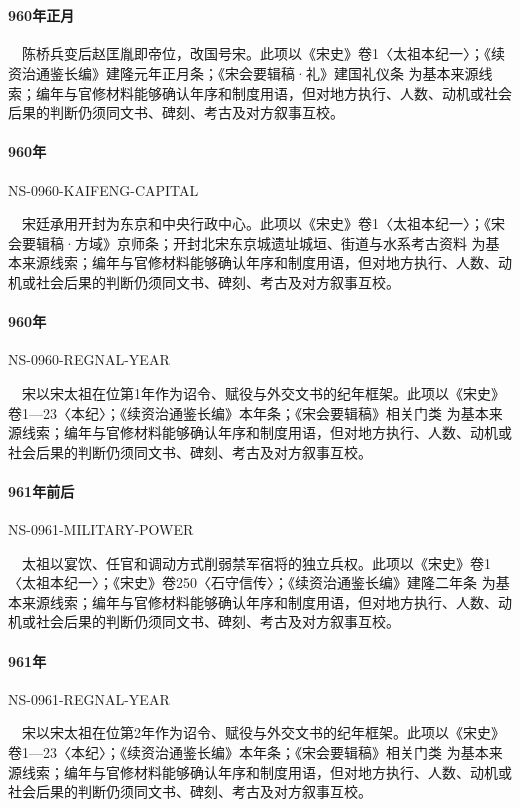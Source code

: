 \section{}

\providecommand{\eventanchor}[2]{\hypertarget{evt:#1}{#2}}

\paragraph{960年正月}　陈桥兵变后赵匡胤即帝位，改国号宋。此项以《宋史》卷1〈太祖本纪一〉；《续资治通鉴长编》建隆元年正月条；《宋会要辑稿·礼》建国礼仪条 为基本来源线索；编年与官修材料能够确认年序和制度用语，但对地方执行、人数、动机或社会后果的判断仍须同文书、碑刻、考古及对方叙事互校。

\paragraph{960年}\eventanchor{NS-0960-KAIFENG-CAPITAL}{NS-0960-KAIFENG-CAPITAL}　宋廷承用开封为东京和中央行政中心。此项以《宋史》卷1〈太祖本纪一〉；《宋会要辑稿·方域》京师条；开封北宋东京城遗址城垣、街道与水系考古资料 为基本来源线索；编年与官修材料能够确认年序和制度用语，但对地方执行、人数、动机或社会后果的判断仍须同文书、碑刻、考古及对方叙事互校。

\paragraph{960年}\eventanchor{NS-0960-REGNAL-YEAR}{NS-0960-REGNAL-YEAR}　宋以宋太祖在位第1年作为诏令、赋役与外交文书的纪年框架。此项以《宋史》卷1—23〈本纪〉；《续资治通鉴长编》本年条；《宋会要辑稿》相关门类 为基本来源线索；编年与官修材料能够确认年序和制度用语，但对地方执行、人数、动机或社会后果的判断仍须同文书、碑刻、考古及对方叙事互校。

\paragraph{961年前后}\eventanchor{NS-0961-MILITARY-POWER}{NS-0961-MILITARY-POWER}　太祖以宴饮、任官和调动方式削弱禁军宿将的独立兵权。此项以《宋史》卷1〈太祖本纪一〉；《宋史》卷250〈石守信传〉；《续资治通鉴长编》建隆二年条 为基本来源线索；编年与官修材料能够确认年序和制度用语，但对地方执行、人数、动机或社会后果的判断仍须同文书、碑刻、考古及对方叙事互校。

\paragraph{961年}\eventanchor{NS-0961-REGNAL-YEAR}{NS-0961-REGNAL-YEAR}　宋以宋太祖在位第2年作为诏令、赋役与外交文书的纪年框架。此项以《宋史》卷1—23〈本纪〉；《续资治通鉴长编》本年条；《宋会要辑稿》相关门类 为基本来源线索；编年与官修材料能够确认年序和制度用语，但对地方执行、人数、动机或社会后果的判断仍须同文书、碑刻、考古及对方叙事互校。

